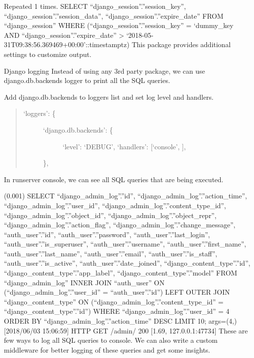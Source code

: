 \documentclass[a5paper,10pt,english]{sphinxmanual}
\begin{document}
Repeated 1 times.
SELECT “django\_session”.”session\_key”,
“django\_session”.”session\_data”, “django\_session”.”expire\_date” FROM
“django\_session” WHERE (“django\_session”.”session\_key” =
‘dummy\_key AND “django\_session”.”expire\_date”
\textgreater{} ‘2018-05-31T09:38:56.369469+00:00’::timestamptz)
This package provides additional settings to customize output.

Django logging
Instead of using any 3rd party package, we can use django.db.backends logger to print all the SQL queries.

Add django.db.backends to loggers list and set log level and handlers.
\begin{quote}
\begin{description}
\item[{‘loggers’: \{}] \leavevmode\begin{description}
\item[{‘django.db.backends’: \{}] \leavevmode
‘level’: ‘DEBUG’,
‘handlers’: {[}‘console’, {]},

\end{description}

\},

\end{description}
\end{quote}

In runserver console, we can see all SQL queries that are being executed.

(0.001) SELECT “django\_admin\_log”.”id”, “django\_admin\_log”.”action\_time”, “django\_admin\_log”.”user\_id”, “django\_admin\_log”.”content\_type\_id”, “django\_admin\_log”.”object\_id”, “django\_admin\_log”.”object\_repr”, “django\_admin\_log”.”action\_flag”, “django\_admin\_log”.”change\_message”, “auth\_user”.”id”, “auth\_user”.”password”, “auth\_user”.”last\_login”, “auth\_user”.”is\_superuser”, “auth\_user”.”username”, “auth\_user”.”first\_name”, “auth\_user”.”last\_name”, “auth\_user”.”email”, “auth\_user”.”is\_staff”, “auth\_user”.”is\_active”, “auth\_user”.”date\_joined”, “django\_content\_type”.”id”, “django\_content\_type”.”app\_label”, “django\_content\_type”.”model” FROM “django\_admin\_log” INNER JOIN “auth\_user” ON (“django\_admin\_log”.”user\_id” = “auth\_user”.”id”) LEFT OUTER JOIN “django\_content\_type” ON (“django\_admin\_log”.”content\_type\_id” = “django\_content\_type”.”id”) WHERE “django\_admin\_log”.”user\_id” = 4 ORDER BY “django\_admin\_log”.”action\_time” DESC LIMIT 10; args=(4,)
{[}2018/06/03 15:06:59{]} HTTP GET /admin/ 200 {[}1.69, 127.0.0.1:47734{]}
These are few ways to log all SQL queries to console. We can also write a custom middleware for better logging of these queries and get some insights.
\end{document}
